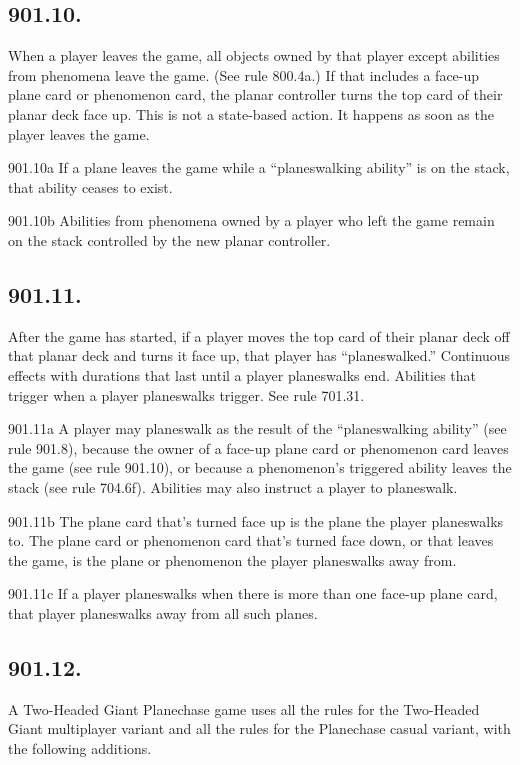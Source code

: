 \subsection*{901.10.}
When a player leaves the game, all objects owned by that player except abilities from phenomena leave the game. (See rule 800.4a.) If that includes a face-up plane card or phenomenon card, the planar controller turns the top card of their planar deck face up. This is not a state-based action. It happens as soon as the player leaves the game.

901.10a If a plane leaves the game while a “planeswalking ability” is on the stack, that ability ceases to exist.

901.10b Abilities from phenomena owned by a player who left the game remain on the stack controlled by the new planar controller.

\subsection*{901.11.}
After the game has started, if a player moves the top card of their planar deck off that planar deck and turns it face up, that player has “planeswalked.” Continuous effects with durations that last until a player planeswalks end. Abilities that trigger when a player planeswalks trigger. See rule 701.31.

901.11a A player may planeswalk as the result of the “planeswalking ability” (see rule 901.8), because the owner of a face-up plane card or phenomenon card leaves the game (see rule 901.10), or because a phenomenon’s triggered ability leaves the stack (see rule 704.6f). Abilities may also instruct a player to planeswalk.

901.11b The plane card that’s turned face up is the plane the player planeswalks to. The plane card or phenomenon card that’s turned face down, or that leaves the game, is the plane or phenomenon the player planeswalks away from.

901.11c If a player planeswalks when there is more than one face-up plane card, that player planeswalks away from all such planes.

\subsection*{901.12.}
A Two-Headed Giant Planechase game uses all the rules for the Two-Headed Giant multiplayer variant and all the rules for the Planechase casual variant, with the following additions.

